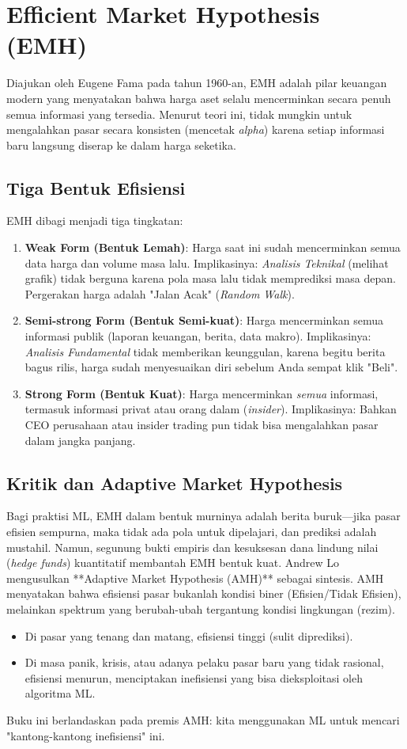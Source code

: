 \documentclass[12pt,a4paper]{book}
\begin{document}
\section{Efficient Market Hypothesis (EMH)}
Diajukan oleh Eugene Fama pada tahun 1960-an, EMH adalah pilar keuangan modern yang menyatakan bahwa harga aset selalu mencerminkan secara penuh semua informasi yang tersedia. Menurut teori ini, tidak mungkin untuk mengalahkan pasar secara konsisten (mencetak \textit{alpha}) karena setiap informasi baru langsung diserap ke dalam harga seketika.

\subsection{Tiga Bentuk Efisiensi}
EMH dibagi menjadi tiga tingkatan:
\begin{enumerate}
    \item \textbf{Weak Form (Bentuk Lemah)}: Harga saat ini sudah mencerminkan semua data harga dan volume masa lalu. Implikasinya: \textit{Analisis Teknikal} (melihat grafik) tidak berguna karena pola masa lalu tidak memprediksi masa depan. Pergerakan harga adalah "Jalan Acak" (\textit{Random Walk}).
    \item \textbf{Semi-strong Form (Bentuk Semi-kuat)}: Harga mencerminkan semua informasi publik (laporan keuangan, berita, data makro). Implikasinya: \textit{Analisis Fundamental} tidak memberikan keunggulan, karena begitu berita bagus rilis, harga sudah menyesuaikan diri sebelum Anda sempat klik "Beli".
    \item \textbf{Strong Form (Bentuk Kuat)}: Harga mencerminkan \textit{semua} informasi, termasuk informasi privat atau orang dalam (\textit{insider}). Implikasinya: Bahkan CEO perusahaan atau insider trading pun tidak bisa mengalahkan pasar dalam jangka panjang.
\end{enumerate}

\subsection{Kritik dan Adaptive Market Hypothesis}
Bagi praktisi ML, EMH dalam bentuk murninya adalah berita buruk---jika pasar efisien sempurna, maka tidak ada pola untuk dipelajari, dan prediksi adalah mustahil. Namun, segunung bukti empiris dan kesuksesan dana lindung nilai (\textit{hedge funds}) kuantitatif membantah EMH bentuk kuat.
Andrew Lo mengusulkan **Adaptive Market Hypothesis (AMH)** sebagai sintesis. AMH menyatakan bahwa efisiensi pasar bukanlah kondisi biner (Efisien/Tidak Efisien), melainkan spektrum yang berubah-ubah tergantung kondisi lingkungan (rezim).
\begin{itemize}
    \item Di pasar yang tenang dan matang, efisiensi tinggi (sulit diprediksi).
    \item Di masa panik, krisis, atau adanya pelaku pasar baru yang tidak rasional, efisiensi menurun, menciptakan inefisiensi yang bisa dieksploitasi oleh algoritma ML.
\end{itemize}
Buku ini berlandaskan pada premis AMH: kita menggunakan ML untuk mencari "kantong-kantong inefisiensi" ini.
\end{document}
